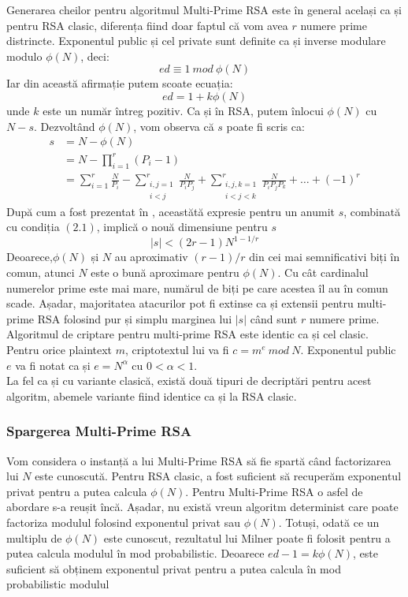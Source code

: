\documentclass[12]{report}
\begin{document}
Generarea cheilor pentru algoritmul Multi-Prime RSA este în general același ca și pentru RSA clasic, diferența fiind doar faptul că vom avea $r$ numere prime distrincte. Exponentul public și cel private sunt definite ca și inverse modulare modulo $\phi(N)$, deci:
$$ ed \equiv 1 \ mod \ \phi(N)$$
Iar din această afirmație putem scoate ecuația:
$$ ed=1+k\phi(N)$$
unde $k$ este un număr întreg pozitiv. Ca și în RSA, putem înlocui $\phi(N)$ cu $N-s$. Dezvoltând $\phi(N)$, vom observa că $s$ poate fi scris ca:
\begin{align*}
s &= N - \phi(N) \\
&= N - \prod_{i=1}^{r} (P_i-1) \\
&= \sum_{i=1}^{r}\frac{N}{P_i} - \sum_{\substack{i,j=1 \\  i<j}}^{r} \frac{N}{P_iP_j} + \sum_{
\substack{i,j,k=1 \\ i<j<k}}^{r} \frac{N}{P_i P_j P_k} + \dots + (-1)^{r}
\end{align*}
După cum a fost prezentat în \cite{osutanoua}, aceastătă expresie pentru un anumit $s$, combinată cu condiția $(2.1)$, implică o nouă dimensiune pentru $s$
\begin{equation}
|s| < (2r-1)N^{1-1/r}
\end{equation}
Deoarece,$\phi(N)$ și $N$ au aproximativ $(r-1)/r$ din cei mai semnificativi biți în comun, atunci $N$ este o bună aproximare pentru $\phi(N)$. Cu cât cardinalul numerelor prime este mai mare, numărul de biți pe care acestea îl au în comun scade. Așadar, majoritatea atacurilor pot fi extinse ca și extensii pentru multi-prime RSA folosind pur și simplu marginea lui $|s|$ când sunt $r$ numere prime.\\
Algoritmul de criptare pentru multi-prime RSA este identic ca și cel clasic. Pentru orice plaintext $m$, criptotextul lui va fi $c = m^e \ mod \ N$. Exponentul public $e$ va fi notat ca și $e=N^{\alpha}$ cu $0<\alpha<1$.\\
La fel ca și cu variante clasică, există două tipuri de decriptări pentru acest algoritm, abemele variante fiind identice ca și la RSA clasic. 
\subsubsection{Spargerea Multi-Prime RSA}
Vom considera o instanță a lui Multi-Prime RSA să fie spartă când factorizarea lui $N$ este cunoscută. Pentru RSA clasic, a fost suficient să recuperăm exponentul privat pentru a putea calcula $\phi(N)$. Pentru Multi-Prime RSA o asfel de abordare s-a reușit încă. Așadar, nu există vreun algoritm determinist care poate factoriza modulul folosind exponentul privat sau $\phi(N)$. Totuși, odată ce un multiplu de $\phi(N)$ este cunoscut, rezultatul lui Milner \cite{Milner3} poate fi folosit pentru a putea calcula modulul în mod probabilistic. Deoarece $ed -1 = k\phi(N)$, este suficient să obținem exponentul privat pentru a putea calcula în mod probabilistic modulul
\end{document}
